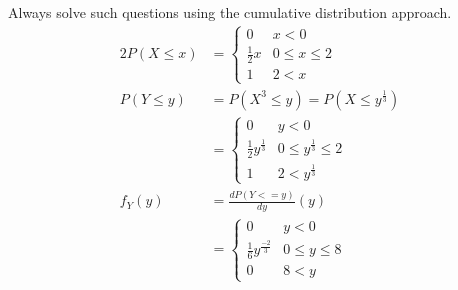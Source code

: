 \documentclass[../../probability-notes.tex]{subfile}
\begin{document}
        Always solve such questions using the cumulative distribution approach.
        \begin{alignat*}{2}
            P(X \leq x) &= \begin{cases} 0 &\mbox{$x < 0$}\\
                                        \frac{1}{2} x &\mbox{$0 \leq x \leq 2$}\\
                                        1 &\mbox{$2 < x$} \end{cases}\\
            P(Y \leq y) &= P(X^{3} \leq y) = P(X \leq y^{\frac{1}{3}})\\
                        &= \begin{cases}  0 &\mbox{$y < 0$}\\
                                            \frac{1}{2} y^{\frac{1}{3}} &\mbox{$0 \leq y^{\frac{1}{3}} \leq 2$}\\
                                            1 &\mbox{$2 < y^{\frac{1}{3}}$} \end{cases}\\
            f_{Y}(y) &= \frac{dP(Y <= y)}{dy}(y)\\
                     &= \begin{cases}  0 &\mbox{$y < 0$}\\
                                            \frac{1}{6} y^{\frac{-2}{3}} &\mbox{$0 \leq y \leq 8$}\\
                                            0 &\mbox{$8 < y$} \end{cases}
        \end{alignat*}
\end{document}
